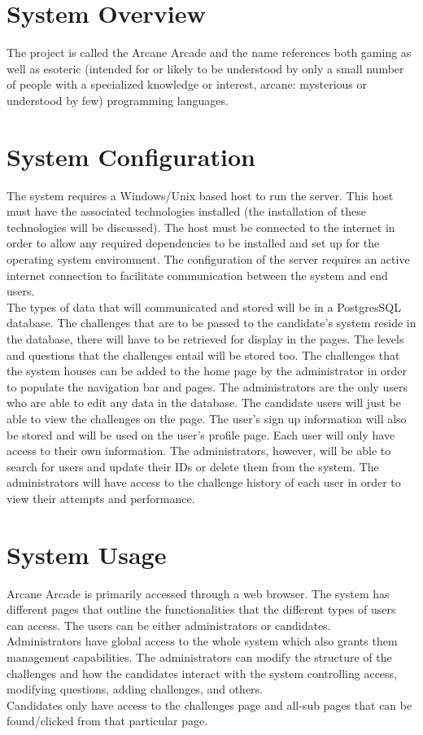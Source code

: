 \documentclass[english]{article}
\begin{document}
		
	\section{System Overview}
	The project is called the Arcane Arcade and the name references both gaming as well as esoteric (intended for or likely to be understood by only a 		small number of people with a specialized knowledge or interest, arcane: mysterious or understood by few) programming languages.
	
	\section{System Configuration}
	The system requires a Windows/Unix based host to run the server. This
host must have the associated technologies installed (the installation of these
technologies will be discussed). The host must be connected to the
internet in order to allow any required dependencies to be installed and set
up for the operating system environment. The configuration of the server
requires an active internet connection to facilitate communication between the
system and end users.
	\\[12pt]
 The types of data that will communicated and stored will be in a PostgresSQL database. The challenges that are to be passed to the candidate's system reside in the database, there will have to be retrieved for display in the pages. The levels and questions that the challenges entail will be stored too. The challenges that the system houses can be added to
the home page by the administrator in order to populate the navigation bar and pages. The administrators are the only users who are able to  edit any data in the database.
\newpage
 The candidate users will just be able to view the challenges on the page. The user's sign up information will also be stored and will be used on the user's profile page. Each user will only have access to their own information. The administrators, however, will be able to search for users and update their IDs or delete them from the system. The administrators will have access to the challenge history of each user in order to view their attempts and performance.

	
	
	\section{System Usage}
	Arcane Arcade is primarily accessed through a web browser. The system has different pages that outline the functionalities that the different types of users can access. The users can be either administrators or candidates. 
		\\[12pt]
	Administrators have global access to the whole system which also grants them management capabilities. The administrators can modify the structure of the challenges and how the candidates interact with the system controlling access, modifying questions, adding challenges, and others.
		\\[12pt]
	Candidates only have access to the challenges page and all-sub pages that can be found/clicked from that particular page.
	
\end{document}
